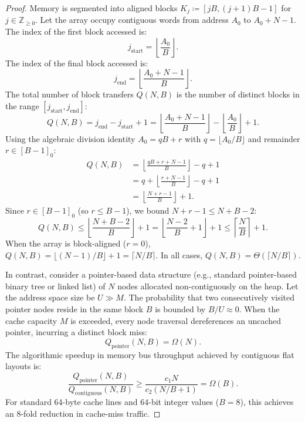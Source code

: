 \documentclass[11pt, letterpaper]{article}
\begin{document}
\begin{proof}
Memory is segmented into aligned blocks $K_j \coloneqq [jB, (j+1)B - 1]$ for $j \in \mathbb{Z}_{\ge 0}$.
Let the array occupy contiguous words from address $A_0$ to $A_0 + N - 1$.
The index of the first block accessed is:
\begin{equation}
    j_{\text{start}} = \left\lfloor \frac{A_0}{B} \right\rfloor.
\end{equation}
The index of the final block accessed is:
\begin{equation}
    j_{\text{end}} = \left\lfloor \frac{A_0 + N - 1}{B} \right\rfloor.
\end{equation}
The total number of block transfers $Q(N, B)$ is the number of distinct blocks in the range $[j_{\text{start}}, j_{\text{end}}]$:
\begin{equation}
    Q(N, B) = j_{\text{end}} - j_{\text{start}} + 1 = \left\lfloor \frac{A_0 + N - 1}{B} \right\rfloor - \left\lfloor \frac{A_0}{B} \right\rfloor + 1.
\end{equation}
Using the algebraic division identity $A_0 = q B + r$ with $q = \lfloor A_0 / B \rfloor$ and remainder $r \in [B-1]_0$:
\begin{align}
    Q(N, B) &= \left\lfloor \frac{q B + r + N - 1}{B} \right\rfloor - q + 1 \\
    &= q + \left\lfloor \frac{r + N - 1}{B} \right\rfloor - q + 1 \\
    &= \left\lfloor \frac{N + r - 1}{B} \right\rfloor + 1.
\end{align}
Since $r \in [B-1]_0$ (so $r \le B - 1$), we bound $N + r - 1 \le N + B - 2$:
\begin{equation}
    Q(N, B) \le \left\lfloor \frac{N + B - 2}{B} \right\rfloor + 1 = \left\lfloor \frac{N - 2}{B} + 1 \right\rfloor + 1 \le \left\lceil \frac{N}{B} \right\rceil + 1.
\end{equation}
When the array is block-aligned ($r = 0$), $Q(N, B) = \lfloor (N - 1)/B \rfloor + 1 = \lceil N/B \rceil$. In all cases, $Q(N, B) = \Theta(\lceil N/B \rceil)$.

In contrast, consider a pointer-based data structure (e.g., standard pointer-based binary tree or linked list) of $N$ nodes allocated non-contiguously on the heap. Let the address space size be $U \gg M$. The probability that two consecutively visited pointer nodes reside in the same block $B$ is bounded by $B/U \approx 0$. When the cache capacity $M$ is exceeded, every node traversal dereferences an uncached pointer, incurring a distinct block miss:
\begin{equation}
    Q_{\text{pointer}}(N, B) = \Omega(N).
\end{equation}
The algorithmic speedup in memory bus throughput achieved by contiguous flat layouts is:
\begin{equation}
    \frac{Q_{\text{pointer}}(N, B)}{Q_{\text{contiguous}}(N, B)} \ge \frac{c_1 N}{c_2 (N/B + 1)} = \Omega(B).
\end{equation}
For standard 64-byte cache lines and 64-bit integer values ($B = 8$), this achieves an 8-fold reduction in cache-miss traffic.
\end{proof}
\end{document}
